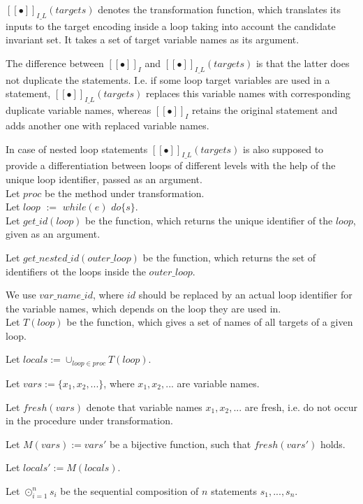 \documentclass[a4paper,12pt]{article}
\begin{document}
	$[[\bullet]]_{I\_L}(targets)$ denotes the transformation function, which translates its inputs to the target encoding inside a loop taking into account the candidate invariant set. It takes a set of target variable names as its argument.
	
	The difference between 
	$[[\bullet]]_I$ and $[[\bullet]]_{I\_L}(targets)$ is that the latter does not duplicate the statements. 
	I.e. if some loop target variables are used in a statement, $[[\bullet]]_{I\_L}(targets)$ replaces this variable names with corresponding duplicate variable names, whereas $[[\bullet]]_I$ retains the original statement and adds another one with replaced variable names. 
	
	In case of nested loop statements
	$[[\bullet]]_{I\_L}(targets)$ is also supposed to provide a
	differentiation between loops of different levels with the help of the unique loop identifier, passed as an argument.
	\\
	
	Let $proc$ be the method under transformation.
	\\
	
	Let $loop$ $:=$ $while(e)$ $do\{s\}$.
	\\
	
	Let $get\_id(loop)$ be the function, which returns the unique identifier of the $loop$, given as an argument.
	
	Let $get\_nested\_id(outer\_loop)$ be the function, which returns the set of identifiers ot the loops inside the $outer\_loop$.
	
	We use $var\_name\_id$, where $id$ should be replaced by an actual loop identifier for the variable names, which depends on the loop they are used in.  
	\\
	
	Let $T(loop)$ be the function, which gives a set of names of all targets of a given loop. 
	
	Let $locals := \cup_{loop \in proc} T(loop)$.
	
	Let $vars := \{x_1, x_2,...\}$, 
	where $x_1, x_2,...$ are variable names.
	
	Let $fresh(vars)$ denote that variable names $x_1, x_2,...$ are fresh, i.e. do not occur in the procedure under transformation.
	
	Let $M(vars) := vars'$ be a bijective function, 
	such that $fresh(vars')$ holds. 
	
	Let $locals' := M(locals)$.
	
	Let $\odot^n_{i=1}s_i$ be the sequential composition of $n$ statements $s_1,...,s_n$.
	\\
	
\end{document}
